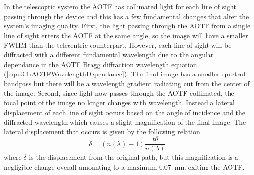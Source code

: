 \documentclass[12pt]{article}
\begin{document}

In the telescoptic system the AOTF has collimated light for each line of sight passing through the device and this has a few fundamental changes that alter the system's imaging quality. First, the light passing through the AOTF from a single line of sight enters the AOTF at the same angle, so the image will have a smaller FWHM than the telecentric counterpart. However, each line of sight will be diffracted with a different fundamental wavelength due to the angular dependance in the AOTF Bragg diffraction wavelength equation (\autoref{eqn:3.1:AOTFWavelengthDependance}). The final image has a smaller spectral bandpass but there will be a wavelength gradient radiating out from the center of the image. Second, since light now passes through the AOTF collimated, the focal point of the image no longer changes with wavelength. Instead a lateral displacement of each line of sight occurs based on the angle of incidence and the diffracted wavelength which causes a slight magnification of the final image. The lateral displacement that occurs is given by the following relation
\begin{equation}
    \delta = (n(\lambda)-1)\frac{t\theta}{n(\lambda)}
    \label{eqn:3.2:planeParallelDiplacement}
\end{equation}
where $\delta$ is the displacement from the original path, but this magnification is a negligible change overall amounting to a maximum 0.07~mm exiting the AOTF.

\end{document}

